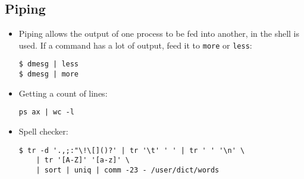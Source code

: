 \documentclass[]{article}
\begin{document}
\subsection{\texorpdfstring{\textbf{Piping}}{Piping}}\label{header-n676}

\begin{itemize}
\item
  Piping allows the output of one process to be fed into another, in the
  shell \texttt{\textbar{}} is used. If a command has a lot of output,
  feed it to \texttt{more} or \texttt{less}:

\begin{verbatim}
$ dmesg | less
$ dmesg | more
\end{verbatim}
\item
  Getting a count of lines:

\begin{verbatim}
ps ax | wc -l
\end{verbatim}
\item
  Spell checker:

\begin{verbatim}
$ tr -d '.,;:"\!\[]()?' | tr '\t' ' ' | tr ' ' '\n' \
    | tr '[A-Z]' '[a-z]' \
    | sort | uniq | comm -23 - /user/dict/words
\end{verbatim}
\end{itemize}
\end{document}

